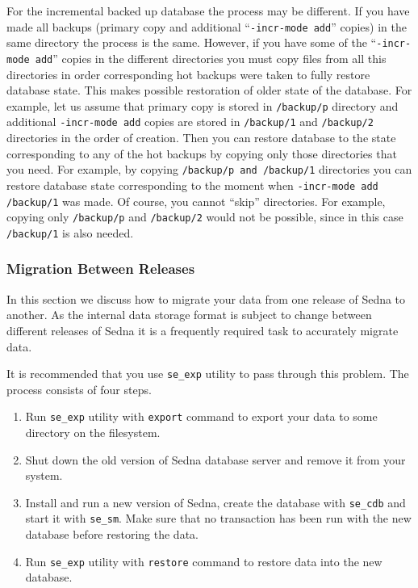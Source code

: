 \documentclass[a4paper,12pt]{article}
\begin{document}
For the incremental backed up database the process may be different. If you have
made all backups (primary copy and additional ``\verb!-incr-mode add!'' copies)
in the same directory the process is the same. However, if you have some of the
``\verb!-incr-mode add!'' copies in the different directories you must copy
files from all this directories in order corresponding hot backups were taken to
fully restore database state. This makes possible restoration of older state of
the database. For example, let us assume that primary copy is stored in
\verb!/backup/p! directory and additional \verb!-incr-mode add! copies are
stored in \verb!/backup/1! and \verb!/backup/2! directories in the order of
creation. Then you can restore database to the state corresponding to any of the
hot backups by copying only those directories that you need. For example, by
copying \verb!/backup/p and !\verb!/backup/1! directories you can restore
database state corresponding to the moment when \verb!-incr-mode add /backup/1!
was made. Of course, you cannot ``skip'' directories. For example, copying only
\verb!/backup/p! and \verb!/backup/2! would not be possible, since in this case
\verb!/backup/1! is also needed.

\subsubsection{Migration Between Releases}
\label{sec:release-migr}

In this section we discuss how to migrate your data from one release of Sedna to
another. As the internal data storage format is subject to change between
different releases of Sedna it is a frequently required task to accurately
migrate data.

It is recommended that you use \verb!se_exp! utility to pass through this
problem. The process consists of four steps.

\begin{enumerate}
\item Run \verb!se_exp! utility with \verb!export! command to export your data
to some directory on the filesystem.
\item Shut down the old version of Sedna database server and remove it from your
system.
\item Install and run a new version of Sedna, create the database with
\verb!se_cdb! and start it with \verb!se_sm!. Make sure that no transaction has
been run with the new database before restoring the data.
\item Run \verb!se_exp! utility with \verb!restore! command to restore data into
the new database.
\end{enumerate}
\end{document}
